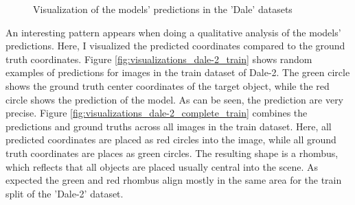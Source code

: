 \begin{figure}[h]
    \centering
    \caption{Visualization of the models' predictions in the 'Dale' datasets}
    \label{fig:visualizations_dale}
\end{figure}

An interesting pattern appears when doing a qualitative analysis of the models' predictions.
Here, I visualized the predicted coordinates compared to the ground truth coordinates.
Figure \ref{fig:visualizations_dale-2_train} shows random examples of predictions for images in the train dataset of Dale-2.
The green circle shows the ground truth center coordinates of the target object, while the red circle shows the prediction of the model.
As can be seen, the prediction are very precise.
Figure \ref{fig:visualizations_dale-2_complete_train} combines the predictions and ground truths across all images in the train dataset.
Here, all predicted coordinates are placed as red circles into the image, while all ground truth coordinates are places as green circles.
The resulting shape is a rhombus, which reflects that all objects are placed usually central into the scene.
As expected the green and red rhombus align mostly in the same area for the train split of the 'Dale-2' dataset.

